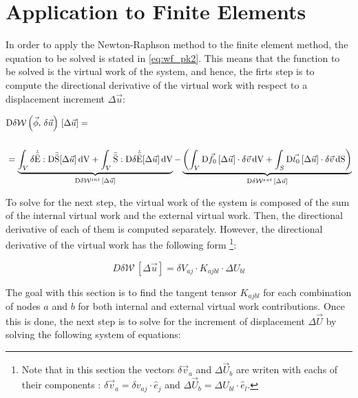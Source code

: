 \section{Application to Finite Elements}

In order to apply the Newton-Raphson method to the finite element method, the equation to be solved is stated in \ref{eq:wf_pk2}. This means that the function to be solved is the virtual work of the system, and hence, the firts step is to compute the directional derivative of the virtual work with respect to a displacement increment $\Delta \vec{u}$:

\begin{equation} \label{eq:dir-der-W}
    \begin{split}
        &\mathrm{D} \delta \mathcal{W} \left( \vec{\phi}, \, \delta \vec{u} \right) \, \left[\Delta \vec{u} \right] = \\\\
        &= \underbrace{\int_V \delta \dot{\bar{\bar{\mathrm{E}}}} : \mathrm{D} \bar{\bar{\mathrm{S}}} [\Delta \vec{u}] \, \mathrm{dV} + \int_V \bar{\bar{\mathrm{S}}} : \mathrm{D} \delta \dot{\bar{\bar{\mathrm{E}}}} [\Delta \vec{u}] \, \mathrm{dV}}_{\mathrm{D} \delta \mathcal{W}^{int} \, \left[\Delta \vec{u} \right]} - \underbrace{\left(\int_V \mathrm{D} \vec{f_0} \, [\Delta \vec{u}] \cdot \delta \vec{v} \, \mathrm{dV} + \int_S \mathrm{D} \vec{t_0} \, [\Delta \vec{u}] \cdot \delta \vec{v} \, \mathrm{dS} \right)}_{\mathrm{D} \delta \mathcal{W}^{ext} \, \left[\Delta \vec{u} \right]} 
    \end{split}
\end{equation}

To solve for the next step, the virtual work of the system is composed of the sum of the internal virtual work and the external virtual work. Then, the directional derivative of each of them is computed separately. However, the directional derivative of the virtual work has the following form \footnote{Note that in this section the vectors $\delta \vec{v}_a$ and $\Delta \vec{U}_b$ are writen with eachs of their components : $\delta \vec{v}_a = \delta v_{aj} \cdot \hat{e}_j$ and $\Delta \vec{U}_b = \Delta U_{bl} \cdot \hat{e}_l$.}:

\begin{equation*}
    D \delta \mathcal{W} \, \left[\Delta \vec{u} \right] = \delta V_{aj} \cdot K_{ajbl} \cdot \Delta U_{bl}
\end{equation*}

The goal with this section is to find the tangent tensor $K_{ajbl}$ for each combination of nodes $a$ and $b$ for both internal and external virtual work contributions. Once this is done, the next step is to solve for the increment of displacement $\Delta \vec{U}$ by solving the following system of equations:

